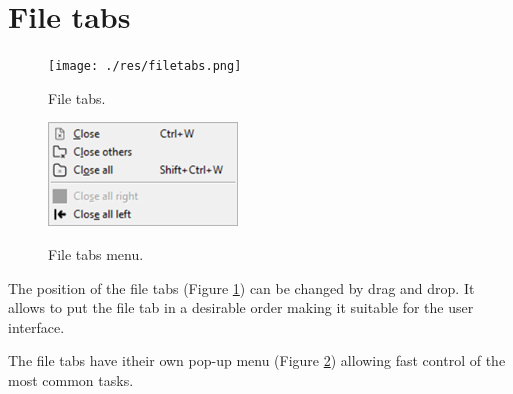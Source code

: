 
\hypertarget{working_filetabs}{}
\section{File tabs}

\begin{figure}[H]
  \texttt{[image: ./res/filetabs.png]}\\
  \caption{File tabs.}
  \label{fig:filetabs}
\end{figure}

\begin{figure}[H]
  \includegraphics[scale=0.35]{./res/filetabs_menu.png}\\
  \caption{File tabs menu.}
  \label{fig:filetabs_menu}
\end{figure}

The position of the file tabs
(Figure \ref{fig:filetabs})
can be changed by drag and drop. It allows to
put the file tab in a desirable order making it suitable for the user interface.

The file tabs have itheir own pop-up menu
(Figure \ref{fig:filetabs_menu})
allowing fast control of the most common tasks.
